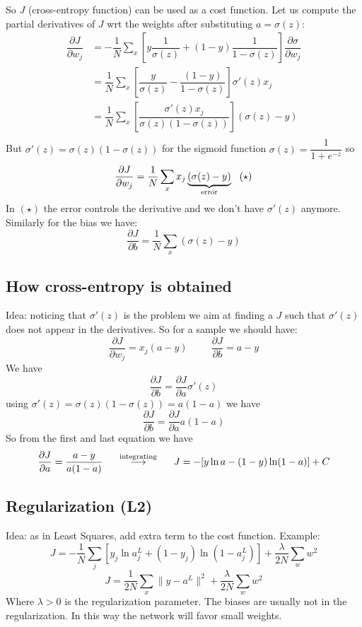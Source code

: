 So $J$ (cross-entropy function) can be used as a cost function.
Let us compute the partial derivatives of $J$ wrt the weights after substituting $a = \sigma(z)$:
\[
    \begin{split}
        \dfrac{\partial J}{\partial w_j} &= -\dfrac{1}{N}\sum_x \left[y\dfrac{1}{\sigma(z)} + (1-y)\dfrac{1}{1-\sigma(z)}\right]\dfrac{\partial \sigma}{\partial w_j}\\
        &= \dfrac{1}{N}\sum_x \left[\dfrac{y}{\sigma(z)} - \dfrac{(1-y)}{1-\sigma(z)}\right]\sigma'(z) x_j \\
        &= \dfrac{1}{N}\sum_x \left[\dfrac{\sigma'(z)x_j}{\sigma(z)(1-\sigma(z))}\right](\sigma(z) - y)\\
    \end{split}
\]
But $\sigma'(z) = \sigma(z)(1-\sigma(z))$ for the sigmoid function $\sigma(z) = \dfrac{1}{1 + e^{-z}}$ so 
\[
    \dfrac{\partial J}{\partial w_j} = \dfrac{1}{N}\sum_x x_j \underbrace{(\sigma(z) - y)}_{\text{error}}\hspace{0.3cm} (\star)    
\] 
In $(\star)$ the error controls the derivative and we don't have $\sigma'(z)$ anymore. Similarly for the bias we have:
\[
    \dfrac{\partial J}{\partial b} = \dfrac{1}{N}\sum_x (\sigma(z) - y)    
\]

\subsection{How cross-entropy is obtained}
Idea: noticing that $\sigma'(z)$ is the problem we aim at finding a $J$ such that $\sigma'(z)$ does not appear in the derivatives. So for a sample we should have:
\[
    \dfrac{\partial J}{\partial w_j} = x_j (a-y) \hspace{1cm} \dfrac{\partial J}{\partial b} = a-y
\]
We have 
\[
    \dfrac{\partial J}{\partial b} = \dfrac{\partial J}{\partial a} \sigma'(z)     
\]
using $\sigma'(z) = \sigma(z)(1- \sigma(z)) = a(1-a)$ we have
\[
    \dfrac{\partial J}{\partial b} = \dfrac{\partial J}{\partial a} a(1-a)    
\]
So from the first and last equation we have
\[
    \dfrac{\partial J}{\partial a} = \dfrac{a-y}{a(1-a)} \hspace{0.5cm}\overset{\text{integrating}}{\longrightarrow} \hspace{0.5cm} J = -[y \ln a - (1-y)\ln(1-a)] + C
\]

\subsection{Regularization (L2)}
Idea: as in Least Squares, add extra term to the cost function. Example:
\[
    J = -\dfrac{1}{N} \sum_j \left[y_j\ln a_j^L + (1-y_j)\ln(1-a_j^L)\right] + \dfrac{\lambda}{2N}\sum_w w^2    
\]
\[
    J = \dfrac{1}{2N} \sum_x \|y-a^L\|^2 + \dfrac{\lambda}{2N}\sum_w w^2    
\]
Where $\lambda > 0$ is the regularization parameter. The biases are usually not in the regularization. In this way the network will favor small weights. 

